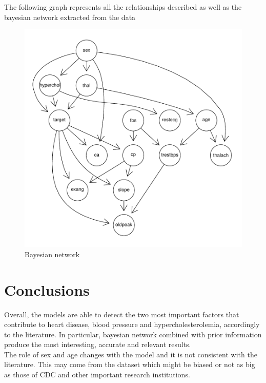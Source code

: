\documentclass{article}
\begin{document}
The following graph represents all the relationships described as well as the bayesian network extracted from the data
\begin{figure}[H]
       \centering
       \includegraphics[width=1\textwidth]{bn res.pdf}
       \caption{Bayesian network}
\end{figure}


\section{Conclusions}
Overall, the models are able to detect the two most important factors that contribute to heart disease, blood pressure and hypercholesterolemia, accordingly to the literature. In particular, bayesian network combined with prior information produce the most interesting, accurate and relevant results.\\
The role of sex and age changes with the model and it is not consistent with the literature. This may come from the dataset which might be biased or not as big as those of CDC and other important research institutions.


\newpage
\end{document}
